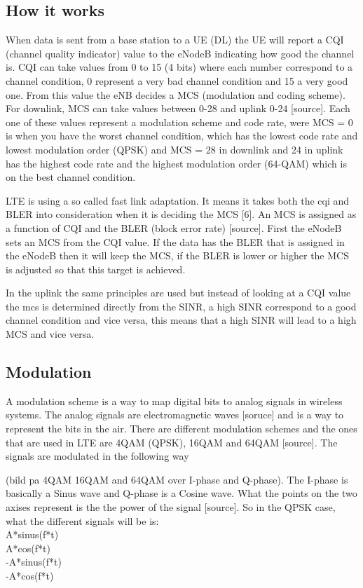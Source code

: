 \documentclass[cropmarks, frame, english]{idamasterthesis}
\begin{document}
\subsection{How it works}
When data is sent from a base station to a UE (DL) the UE will report a CQI (channel quality indicator) value to the eNodeB indicating how good the channel is. CQI can take values from 0 to 15 (4 bits) where each number correspond to a channel condition, 0 represent a very bad channel condition and 15 a very good one. From this value the eNB decides a MCS (modulation and coding scheme). For downlink, MCS can take values between 0-28 and uplink 0-24 [source]. Each one of these values represent a modulation scheme and code rate, were MCS = 0 is when you have the worst channel condition, which has the lowest code rate and lowest modulation order (QPSK) and MCS = 28 in downlink and 24 in uplink has the highest code rate and the highest modulation order (64-QAM) which is on the best channel condition.

LTE is using a so called fast link adaptation. It means it takes both the cqi and BLER into consideration when it is deciding the MCS [6]. An MCS is assigned as a function of CQI and the BLER (block error rate) [source]. First the eNodeB sets an MCS from the CQI value. If the data has the BLER that is assigned in the eNodeB then it will keep the MCS, if the BLER is lower or higher the MCS is adjusted so that this target is achieved. 

In the uplink the same principles are used but instead of looking at a CQI value the mcs is determined directly from the SINR, a high SINR correspond to a good channel condition and vice versa, this means that a high SINR will lead to a high MCS and vice versa.

\subsection{Modulation}
A modulation scheme is a way to map digital bits to analog signals in wireless systems. The analog signals are electromagnetic waves [soruce] and is a way to represent the bits in the air.
There are different modulation schemes and the ones that are used in LTE are 4QAM (QPSK), 16QAM and 64QAM [source]. The signals are modulated in the following way

(bild pa 4QAM 16QAM and 64QAM over I-phase and Q-phase).
The I-phase is basically a Sinus wave and Q-phase is a Cosine wave. What the points on the two axises represent is the the power of the signal [source]. So in the QPSK case, what the different signals will be is:\\
A*sinus(f*t)\\
A*cos(f*t)\\
-A*sinus(f*t) \\
-A*cos(f*t)\\
\end{document}
